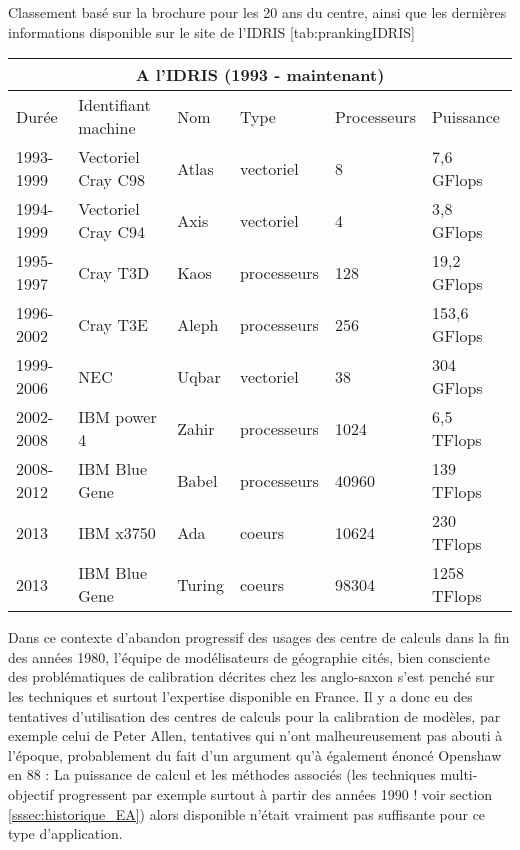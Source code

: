 \begin{table}[!htbp]
\begin{sidecaption}[fortoc]{Classement basé sur la brochure pour les 20 ans du centre, ainsi que les dernières informations disponible sur le site de l'IDRIS}
	[tab:prankingIDRIS]
	\centering
	\begin{tabular}{@{}llllll@{}}
\toprule
\multicolumn{6}{c}{A l'IDRIS (1993 - maintenant)} \\ \midrule
Durée & Identifiant machine & Nom & Type & Processeurs & Puissance \\ \midrule
1993-1999 & Vectoriel Cray C98 & Atlas & vectoriel & 8 & 7,6 GFlops \\
1994-1999 & Vectoriel Cray C94 & Axis & vectoriel & 4 & 3,8 GFlops \\
1995-1997 & Cray T3D & Kaos & processeurs & 128 & 19,2 GFlops \\
1996-2002 & Cray T3E & Aleph & processeurs & 256 & 153,6 GFlops \\
1999-2006 & NEC & Uqbar & vectoriel & 38 & 304 GFlops \\
2002-2008 & IBM power 4 & Zahir & processeurs & 1024 & 6,5 TFlops \\
2008-2012 & IBM Blue Gene & Babel & processeurs & 40960 & 139 TFlops \\
2013 & IBM x3750 & Ada & coeurs & 10624 & 230 TFlops \\
2013 & IBM Blue Gene & Turing & coeurs & 98304 & 1258 TFlops \\ \bottomrule
\end{tabular}
\end{sidecaption}
\end{table}

Dans ce contexte d'abandon progressif des usages des centre de calculs dans la fin des années 1980, l'équipe de modélisateurs de géographie cités, bien consciente des problématiques de calibration décrites chez les anglo-saxon \autocite{Batty1976} s'est penché sur les techniques et surtout l'expertise disponible en France. Il y a donc eu des tentatives d'utilisation des centres de calculs pour la calibration de modèles, par exemple celui de Peter Allen, tentatives qui n'ont malheureusement pas abouti à l'époque, probablement du fait d'un argument qu'à également énoncé Openshaw en 88 : La puissance de calcul et les méthodes associés (les techniques multi-objectif progressent par exemple surtout à partir des années 1990 ! voir section \ref{sssec:historique_EA}) alors disponible n'était vraiment pas suffisante pour ce type d'application. 

